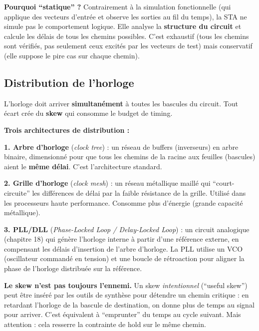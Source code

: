 \documentclass[12pt,a4paper,twoside]{book}
\begin{document}
\begin{intuition}
\textbf{Pourquoi ``statique'' ?} Contrairement à la simulation fonctionnelle (qui applique des vecteurs d'entrée et observe les sorties au fil du temps), la STA ne simule pas le comportement logique. Elle analyse la \textbf{structure du circuit} et calcule les délais de tous les chemins possibles. C'est exhaustif (tous les chemins sont vérifiés, pas seulement ceux excités par les vecteurs de test) mais conservatif (elle suppose le pire cas sur chaque chemin).
\end{intuition}

\subsection{Distribution de l'horloge}

L'horloge doit arriver \textbf{simultanément} à toutes les bascules du circuit. Tout écart crée du \textbf{skew} qui consomme le budget de timing.

\begin{formule}
\textbf{Trois architectures de distribution :}

\textbf{1. Arbre d'horloge} (\textit{clock tree}) : un réseau de buffers (inverseurs) en arbre binaire, dimensionné pour que tous les chemins de la racine aux feuilles (bascules) aient le \textbf{même délai}. C'est l'architecture standard.

\textbf{2. Grille d'horloge} (\textit{clock mesh}) : un réseau métallique maillé qui ``court-circuite'' les différences de délai par la faible résistance de la grille. Utilisé dans les processeurs haute performance. Consomme plus d'énergie (grande capacité métallique).

\textbf{3. PLL/DLL} (\textit{Phase-Locked Loop / Delay-Locked Loop}) : un circuit analogique (chapitre 18) qui génère l'horloge interne à partir d'une référence externe, en compensant les délais d'insertion de l'arbre d'horloge. La PLL utilise un VCO (oscillateur commandé en tension) et une boucle de rétroaction pour aligner la phase de l'horloge distribuée sur la référence.
\end{formule}

\begin{attention}
\textbf{Le skew n'est pas toujours l'ennemi.} Un skew \textit{intentionnel} (``useful skew'') peut être inséré par les outils de synthèse pour détendre un chemin critique : en retardant l'horloge de la bascule de destination, on donne plus de temps au signal pour arriver. C'est équivalent à ``emprunter'' du temps au cycle suivant. Mais attention : cela resserre la contrainte de hold sur le même chemin.
\end{attention}
\end{document}
